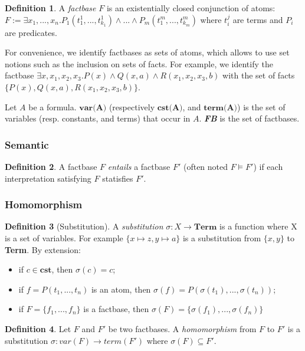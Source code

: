 \documentclass{article}
\theoremstyle{definition}
\newtheorem{definition}{Definition}[section]
\theoremstyle{remark}
\begin{document}
\begin{definition}
A \emph{factbase} $F$ is an existentially closed conjunction of atoms: $F := \exists x_{1},...,x_{n}.P_{1}(t_{1}^{1},...,t_{k_{1}}^{1})\land ...\land P_{m}(t_{1}^{m},...,t_{k_{m}}^{m})$ where $t_i^j$ are terms and $P_i$ are predicates.
\end{definition}
For convenience, we identify factbases as sets of atoms, which allows to  use  set  notions  such  as  the  inclusion  on  sets  of  facts. For example, we identify the factbase $\exists x,x_{1},x_{2},x_{3}. P(x) \land Q(x,a) \land R(x_{1},x_{2},x_{3},b)$ with the set of facts $\{P(x),Q(x,a),R(x_{1},x_{2},x_{3},b)\}$.

Let $A$ be a formula. \emph{$\textbf{var(A)}$} (respectively \emph{$\textbf{cst(A)}$}, and \emph{$\textbf{term(A)}$}) is the set of variables (resp. constants, and terms) that occur in $A$.  \emph{\textbf{FB}} is the set of factbases.

\subsubsection{Semantic}

\begin{definition}
A factbase $F$ \emph{entails} a factbase $F'$ (often noted $F \models F'$) if each interpretation satisfying $F$ statisfies $F'$.
\end{definition}	

\subsubsection{Homomorphism}

\begin{definition}[Substitution]
A \emph{substitution} $\sigma:X \to \textbf{Term}$ is a function where X is a set of variables. For example $\{x \mapsto z, y \mapsto a \}$ is a substitution from $\{x,y\}$ to \textbf{Term}. By extension: 
\begin{itemize}
\item if $c \in \textbf{cst}$, then $\sigma(c) = c$;
\item if $f = P(t_1,...,t_n)$ is an atom, then $\sigma(f) = P(\sigma(t_1),...,\sigma(t_n))$;
\item if $F = \{f_1,...,f_n\}$ is a factbase, then $\sigma(F) = \{\sigma(f_1),...,\sigma(f_n)\}$
\end{itemize}
\end{definition}

\begin{definition}
Let $F$ and $F'$ be two factbases. A \emph{homomorphism} from $F$ to $F'$ is a substitution $\sigma:var(F) \to term(F')$ where $\sigma(F) \subseteq F'$.
\end{definition}
\end{document}

